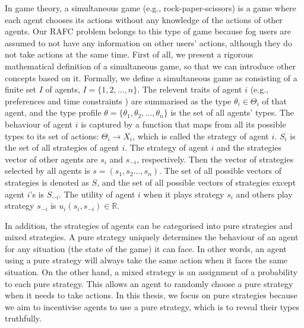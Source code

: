 \documentclass[11pt]{phdthesis}
\begin{document}
In game theory, a simultaneous game (e.g., rock-paper-scissors) is a game where each agent chooses its actions without any knowledge of the actions of other agents. Our RAFC problem belongs to this type of game because fog users are assumed to not have any information on other users' actions, although they do not take actions at the same time. First of all, we present a rigorous mathematical definition of a simultaneous game, so that we can introduce other concepts based on it.
Formally, we define a simultaneous game as consisting of a finite set $I$ of agents, $I = \{1,2,...,n \}$. The relevent traits of agent $ i $ (e.g., preferences and time constraints ) are summarised as the type $ \theta_i \in \Theta_{i} $ of that agent, and the type profile $ \theta = \{ \theta_1, \theta_2, \ldots, \theta_n\} $ is the set of all agents' types. The behaviour of agent $ i $ is captured by a function that maps from all its possible types to its set of actions: $\Theta_i \rightarrow X_i$, which is called the strategy of agent $ i $. $S_i$ is the set of all strategies of agent $i$. The strategy of agent $i$ and the strategies vector of other agents are $s_i$ and $s_{-i}$, respectively. Then the vector of strategies selected by all agents is $s=(s_1,s_2...,s_n)$. The set of all possible vectors of strategies is denoted as $S$, and the set of all possible vectors of strategies except agent $i$'s is $S_{-i}$. The utility of agent $i$ when it plays strategy $s_i$ and others play strategy $s_{-i}$ is $u_i(s_i,s_{-i}) \in \mathbb{R}$. 

In addition, the strategies of agents can be categorised into pure strategies and mixed strategies. A pure strategy uniquely determines the behaviour of an agent for any situation (the state of the game) it can face. In other words, an agent using a pure strategy will always take the same action when it faces the same situation. On the other hand, a mixed strategy is an assignment of a probability to each pure strategy. This allows an agent to randomly choose a pure strategy when it needs to take actions. In this thesis, we focus on pure strategies because we aim to incentivise agents to use a pure strategy, which is to reveal their types truthfully.
\end{document}
